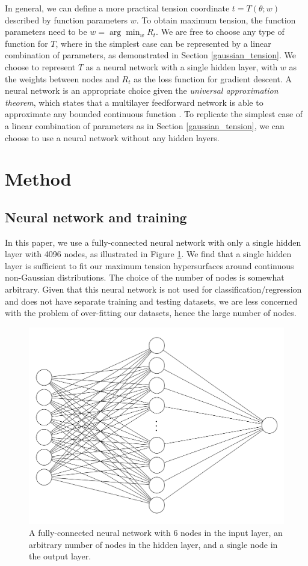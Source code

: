 \documentclass[%
 reprint,
 amsmath,amssymb,
 aps,
]{revtex4-2}
\begin{document}
In general, we can define a more practical tension coordinate $t = T(\theta; w)$ described by function parameters $w$. To obtain maximum tension, the function parameters need to be $w = \arg \min_w R_t$. We are free to choose any type of function for $T$, where in the simplest case can be represented by a linear combination of parameters, as demonstrated in Section \ref{gaussian_tension}. We choose to represent $T$ as a neural network with a single hidden layer, with $w$ as the weights between nodes and $R_t$ as the loss function for gradient descent. A neural network is an appropriate choice given the \textit{universal approximation theorem}, which states that a multilayer feedforward network is able to approximate any bounded continuous function \cite{Hornik1989}. To replicate the simplest case of a linear combination of parameters as in Section \ref{gaussian_tension}, we can choose to use a neural network without any hidden layers.


\section{Method}

\subsection{Neural network and training}

In this paper, we use a fully-connected neural network with only a single hidden layer with 4096 nodes, as illustrated in Figure \ref{fig:NN}. We find that a single hidden layer is sufficient to fit our maximum tension hypersurfaces around continuous non-Gaussian distributions. The choice of the number of nodes is somewhat arbitrary. Given that this neural network is not used for classification/regression and does not have separate training and testing datasets, we are less concerned with the problem of over-fitting our datasets, hence the large number of nodes. 

\begin{figure}
    \includegraphics[width=0.8\columnwidth]{images/nn.png}
    \centering
    \caption{A fully-connected neural network with 6 nodes in the input layer, an arbitrary number of nodes in the hidden layer, and a single node in the output layer.}
    \label{fig:NN}
\end{figure}
\end{document}
